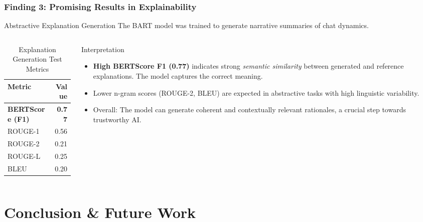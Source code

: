 \documentclass[aspectratio=169]{beamer}
\begin{document}
\begin{frame}
  \frametitle{Finding 3: Promising Results in Explainability}
  
  \begin{block}{Abstractive Explanation Generation}
    The BART model was trained to generate narrative summaries of chat dynamics.
  \end{block}
  
  \begin{columns}[T]
    \begin{column}{0.5\textwidth}
      \begin{table}
        \centering
        \caption{Explanation Generation Test Metrics}
        \begin{tabular}{lr}
          \toprule
          \textbf{Metric} & \textbf{Value} \\
          \midrule
          \textbf{BERTScore (F1)} & \textbf{0.77} \\
          ROUGE-1 & 0.56 \\
          ROUGE-2 & 0.21 \\
          ROUGE-L & 0.25 \\
          BLEU & 0.20 \\
          \bottomrule
        \end{tabular}
      \end{table}
    \end{column}
    \begin{column}{0.5\textwidth}
      \begin{alertblock}{Interpretation}
        \begin{itemize}
            \item \textbf{High BERTScore F1 (0.77)} indicates strong \textit{semantic similarity} between generated and reference explanations. The model captures the correct meaning.
            \item Lower n-gram scores (ROUGE-2, BLEU) are expected in abstractive tasks with high linguistic variability.
            \item Overall: The model can generate coherent and contextually relevant rationales, a crucial step towards trustworthy AI.
        \end{itemize}
      \end{alertblock}
    \end{column}
  \end{columns}
\end{frame}


\section{Conclusion \& Future Work}
\end{document}
